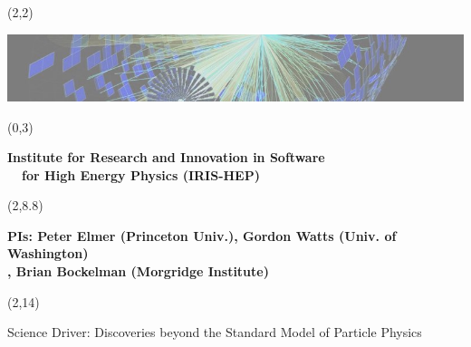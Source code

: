 \documentclass[final]{beamer}
\begin{document}
\begin{frame}{} 

\begin{textblock}{80.0}(2,2)
\begin{center}
\includegraphics[width=1.00\textwidth]{images/Tprime-200pu-PhaseII-black-arctic-main-image-slice.jpg}
\end{center}
\end{textblock}

\begin{textblock}{84.0}(0,3)
\begin{center}
\begin{Huge}
\textbf{
Institute for Research and Innovation in Software \\ 
~~for High Energy Physics (IRIS-HEP)
}
\end{Huge}
\end{center}
\end{textblock}

\begin{textblock}{84.0}(2,8.8)
\begin{center}
\begin{Large}
\textbf{
PIs: Peter Elmer (Princeton Univ.), Gordon Watts (Univ. of Washington)\\ 
, Brian Bockelman (Morgridge Institute)
}
\end{Large}
\end{center}
\end{textblock}


\begin{textblock}{80.0}(2,14)
\begin{block}{Science Driver: Discoveries beyond the Standard Model of Particle Physics}


\end{block}
\end{textblock}
\end{frame}
\end{document}
